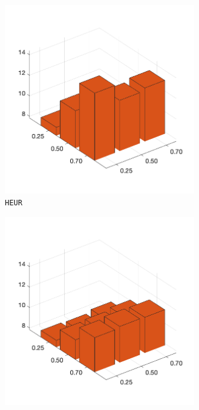 \begin{figure}[H]
\begin{subfigure}[b]{0.25\textwidth}
    	\end{subfigure}
%
	\begin{subfigure}[b]{0.25\textwidth}
		\centering
		\includegraphics[width=0.9\textwidth]{crossover/min/cross_heuristic_2.png}
		\caption{\texttt{HEUR}}
		\label{fig:x}
    	\end{subfigure}
%
	\begin{subfigure}[b]{0.25\textwidth}
		\centering
		\includegraphics[width=0.9\textwidth]{crossover/min/cross_max_preservative_2.png}

\end{subfigure}
\end{figure}
